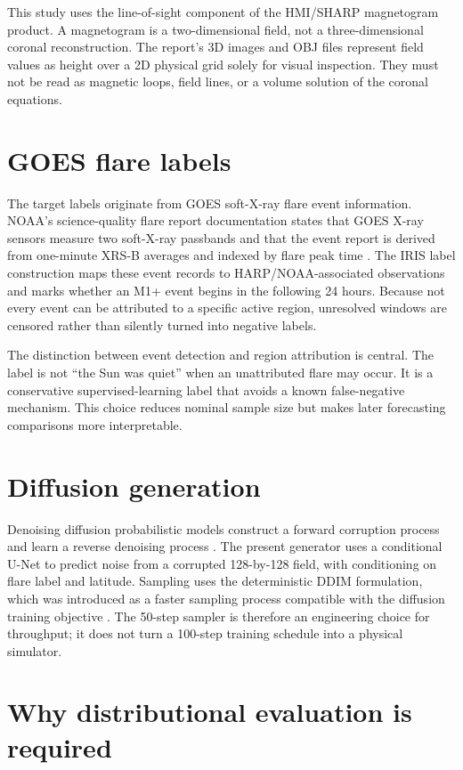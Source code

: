 \documentclass[11pt,oneside]{report}
\begin{document}
This study uses the line-of-sight component of the HMI/SHARP magnetogram product. A magnetogram is a two-dimensional field, not a three-dimensional coronal reconstruction. The report’s 3D images and OBJ files represent field values as height over a 2D physical grid solely for visual inspection. They must not be read as magnetic loops, field lines, or a volume solution of the coronal equations.

\section{GOES flare labels}

The target labels originate from GOES soft-X-ray flare event information. NOAA’s science-quality flare report documentation states that GOES X-ray sensors measure two soft-X-ray passbands and that the event report is derived from one-minute XRS-B averages and indexed by flare peak time \cite{noaa_goes_readme}. The IRIS label construction maps these event records to HARP/NOAA-associated observations and marks whether an M1+ event begins in the following 24 hours. Because not every event can be attributed to a specific active region, unresolved windows are censored rather than silently turned into negative labels.

The distinction between event detection and region attribution is central. The label is not “the Sun was quiet” when an unattributed flare may occur. It is a conservative supervised-learning label that avoids a known false-negative mechanism. This choice reduces nominal sample size but makes later forecasting comparisons more interpretable.

\section{Diffusion generation}

Denoising diffusion probabilistic models construct a forward corruption process and learn a reverse denoising process \cite{ho2020}. The present generator uses a conditional U-Net to predict noise from a corrupted 128-by-128 field, with conditioning on flare label and latitude. Sampling uses the deterministic DDIM formulation, which was introduced as a faster sampling process compatible with the diffusion training objective \cite{song2020ddim}. The 50-step sampler is therefore an engineering choice for throughput; it does not turn a 100-step training schedule into a physical simulator.

\section{Why distributional evaluation is required}
\end{document}
